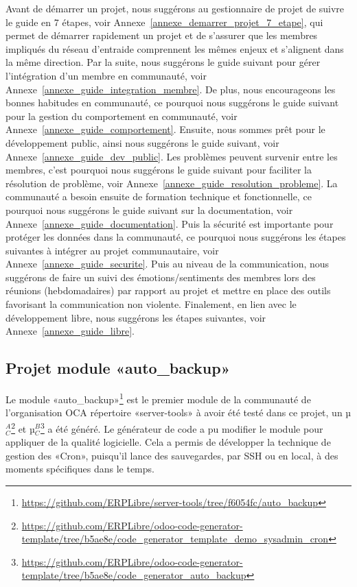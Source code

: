 
Avant de démarrer un projet, nous suggérons au gestionnaire de projet de suivre le guide en 7 étapes, voir Annexe~\ref{annexe_demarrer_projet_7_etape}, qui permet de démarrer rapidement un projet et de s'assurer que les membres impliqués du réseau d'entraide comprennent les mêmes enjeux et s'alignent dans la même direction. Par la suite, nous suggérons le guide suivant pour gérer l'intégration d'un membre en communauté, voir Annexe~\ref{annexe_guide_integration_membre}. De plus, nous encourageons les bonnes habitudes en communauté, ce pourquoi nous suggérons le guide suivant pour la gestion du comportement en communauté, voir Annexe~\ref{annexe_guide_comportement}. Ensuite, nous sommes prêt pour le développement public, ainsi nous suggérons le guide suivant, voir Annexe~\ref{annexe_guide_dev_public}. Les problèmes peuvent survenir entre les membres, c'est pourquoi nous suggérons le guide suivant pour faciliter la résolution de problème, voir Annexe~\ref{annexe_guide_resolution_probleme}. La communauté a besoin ensuite de formation technique et fonctionnelle, ce pourquoi nous suggérons le guide suivant sur la documentation, voir Annexe~\ref{annexe_guide_documentation}. Puis la sécurité est importante pour protéger les données dans la communauté, ce pourquoi nous suggérons les étapes suivantes à intégrer au projet communautaire, voir Annexe~\ref{annexe_guide_securite}. Puis au niveau de la communication, nous suggérons de faire un suivi des émotions/sentiments des membres lors des réunions (hebdomadaires) par rapport au projet et mettre en place des outils favorisant la communication non violente. Finalement, en lien avec le développement libre, nous suggérons les étapes suivantes, voir Annexe~\ref{annexe_guide_libre}.


\subsection{Projet module «auto\_backup»}

Le module «auto\_backup»\footnote{\url{https://github.com/ERPLibre/server-tools/tree/f6054fc/auto_backup}} est le premier module de la communauté de l'organisation OCA répertoire «server-tools» à avoir été testé dans ce projet, un µ$_C^A$\footnote{\url{https://github.com/ERPLibre/odoo-code-generator-template/tree/b5ae8e/code_generator_template_demo_sysadmin_cron}} et µ$_C^B$\footnote{\url{https://github.com/ERPLibre/odoo-code-generator-template/tree/b5ae8e/code_generator_auto_backup}} a été généré. Le générateur de code a pu modifier le module pour appliquer de la qualité logicielle. Cela a permis de développer la technique de gestion des «Cron», puisqu’il lance des sauvegardes, par SSH ou en local, à des moments spécifiques dans le temps.

